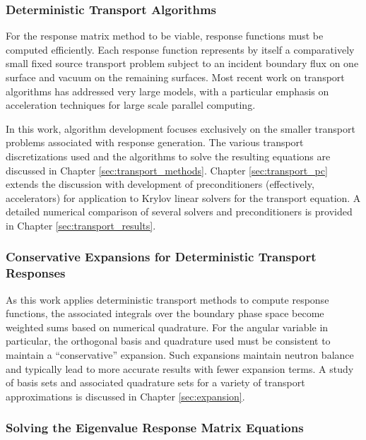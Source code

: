 \subsubsection{Deterministic Transport Algorithms}

For the response matrix method to be viable, response functions must be 
computed efficiently.  Each response function represents by itself a 
comparatively small fixed source transport problem subject to an incident 
boundary flux on one surface and vacuum on the remaining surfaces.  Most 
recent work on transport algorithms has addressed very large models, with 
a particular emphasis on acceleration techniques for large scale
parallel computing.  

In this work, algorithm development focuses exclusively on the smaller 
transport problems associated with response generation.  
The various transport discretizations
used and the algorithms to solve the resulting equations 
are discussed in Chapter \ref{sec:transport_methods}.  Chapter 
\ref{sec:transport_pc} extends the discussion with development of 
preconditioners (effectively, accelerators) for application to 
Krylov linear solvers for the transport equation.  A detailed numerical 
comparison of several solvers and preconditioners is provided in Chapter 
\ref{sec:transport_results}.

\subsubsection{Conservative Expansions for Deterministic Transport Responses}

As this work applies deterministic transport methods to compute response
functions, the associated integrals over the boundary phase 
space become weighted sums based on numerical quadrature.  For the 
angular variable in particular, the orthogonal basis and quadrature used
must be consistent to maintain a ``conservative'' expansion.  Such  
expansions maintain neutron balance and typically lead to more 
accurate results with fewer expansion terms. A study of basis sets 
and associated quadrature sets for a variety of transport approximations 
is discussed in Chapter \ref{sec:expansion}.

\subsubsection{Solving the Eigenvalue Response Matrix Equations}

